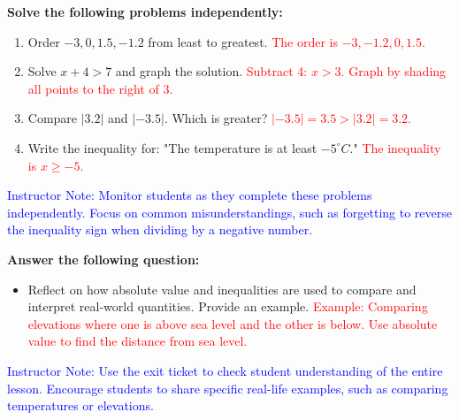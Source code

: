 \documentclass[12pt]{article}
\begin{document}
\begin{tcolorbox}[colframe=black!60, colback=white, 
coltitle=black, colbacktitle=black!15, fonttitle=\bfseries\Large, 
title=Independent Practice, halign title=center, left=10pt, right=10pt, top=10pt, bottom=15pt]
\textbf{Solve the following problems independently:}
\begin{enumerate}[itemsep=3em]
    \item Order \( -3, 0, 1.5, -1.2 \) from least to greatest. \textcolor{red}{The order is \( -3, -1.2, 0, 1.5 \).}
    \item Solve \( x + 4 > 7 \) and graph the solution. \textcolor{red}{Subtract 4: \( x > 3 \). Graph by shading all points to the right of \( 3 \).}
    \item Compare \( |3.2| \) and \( |-3.5| \). Which is greater? \textcolor{red}{\( |-3.5| = 3.5 > |3.2| = 3.2 \).}
    \item Write the inequality for: "The temperature is at least \( -5^\circ C \)." \textcolor{red}{The inequality is \( x \geq -5 \).}
\end{enumerate}

\textcolor{blue}{Instructor Note: Monitor students as they complete these problems independently. Focus on common misunderstandings, such as forgetting to reverse the inequality sign when dividing by a negative number.}
\end{tcolorbox}

\begin{tcolorbox}[colframe=black!60, colback=white, 
coltitle=black, colbacktitle=black!15, fonttitle=\bfseries\Large, 
title=Exit Ticket, halign title=center, left=10pt, right=10pt, top=10pt, bottom=15pt]
\textbf{Answer the following question:}
\begin{itemize}
    \item Reflect on how absolute value and inequalities are used to compare and interpret real-world quantities. Provide an example. \textcolor{red}{Example: Comparing elevations where one is above sea level and the other is below. Use absolute value to find the distance from sea level.}
\end{itemize}

\textcolor{blue}{Instructor Note: Use the exit ticket to check student understanding of the entire lesson. Encourage students to share specific real-life examples, such as comparing temperatures or elevations.}
\end{tcolorbox}
\end{document}
